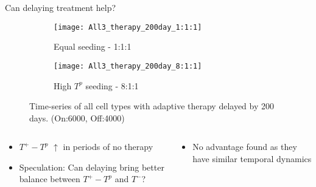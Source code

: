 \begin{frame}{Can delaying treatment help?}
  \begin{figure}[h]
    \begin{adjustwidth}{-5cm}{-5cm}
      \centering
      \begin{subfigure}[b]{0.53\textwidth}
        \centering
        \texttt{[image: All3\_therapy\_200day\_1:1:1]}
        \caption{Equal seeding - 1:1:1}
      \end{subfigure}
      \begin{subfigure}[b]{0.53\textwidth}
        \centering
        \texttt{[image: All3\_therapy\_200day\_8:1:1]}
        \caption{High $T^p$ seeding - 8:1:1}
      \end{subfigure}
    \end{adjustwidth}
    \caption{Time-series of all cell types with adaptive therapy delayed by 200 days. (On:6000, Off:4000)}
  \end{figure}
  \begin{columns}
    \begin{column}{0.5\textwidth}
      \begin{itemize}
        \item<1-> $T^+ - T^p$ $\uparrow$ in periods of no therapy
        \item<2-> Speculation: Can delaying bring better balance between $T^+ - T^p$ and $T^-$?
      \end{itemize}
    \end{column}
    \begin{column}{0.5\textwidth}
      \begin{itemize}
        \item<3-> No advantage found as they have similar temporal dynamics
      \end{itemize}
    \end{column}
  \end{columns}
\end{frame}

